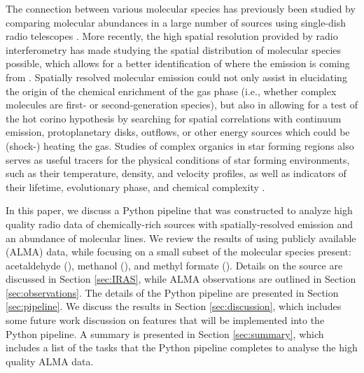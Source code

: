 \documentclass[iop,twocolappendix]{emulateapj}
\begin{document}
The connection between various molecular species has previously been studied by comparing molecular abundances in a large number of sources using single-dish radio telescopes \citep[e.g.,][]{vanderTak2000}. More recently, the high spatial resolution provided by radio interferometry has made studying the spatial distribution of molecular species possible, which allows for a better identification of where the emission is coming from \citep[e.g.,][]{Bisschop2008}. Spatially resolved molecular emission could not only assist in elucidating the origin of the chemical enrichment of the gas phase (i.e., whether complex molecules are first- or second-generation species), but also in allowing for a test of the hot corino hypothesis by searching for spatial correlations with continuum emission, protoplanetary disks, outflows, or other energy sources which could be (shock-) heating the gas. Studies of complex organics in star forming regions also serves as useful tracers for the physical conditions of star forming environments, such as their temperature, density, and velocity profiles, as well as indicators of their lifetime, evolutionary phase, and chemical complexity \citep{Herbst2009}.

In this paper, we discuss a Python pipeline that was constructed to analyze high quality radio data of chemically-rich sources with spatially-resolved emission and an abundance of molecular lines. We review the results of {\IRAS} using publicly available {\ALMA} (ALMA) data, while focusing on a small subset of the molecular species present: acetaldehyde (\A), methanol (\M), and methyl formate (\MF). Details on the {\IRAS} source are discussed in Section \ref{sec:IRAS}, while ALMA observations are outlined in Section \ref{sec:observations}. The details of the Python pipeline are presented in Section \ref{sec:pipeline}. We discuss the results in Section \ref{sec:discussion}, which includes some future work discussion on features that will be implemented into the Python pipeline. A summary is presented in Section \ref{sec:summary}, which includes a list of the tasks that the Python pipeline completes to analyse the high quality ALMA data.
\end{document}
